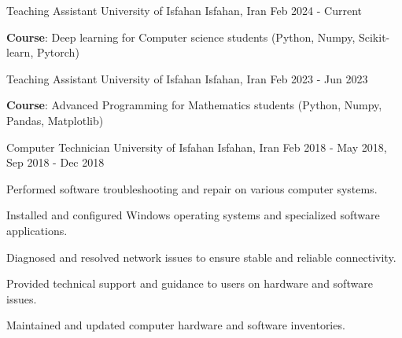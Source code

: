 

\begin{cventries}

  \cventry
    {Teaching Assistant} %
    {University of Isfahan} %
    {Isfahan, Iran} %
    {Feb 2024 - Current } %
    {
      \begin{cvitems} 
      	\textbf{Course}: Deep learning  for Computer science students (Python, Numpy, Scikit-learn,  Pytorch)
      \end{cvitems}
    }
  \cventry
{Teaching Assistant} %
{University of Isfahan} %
{Isfahan, Iran} %
{Feb 2023 - Jun 2023} %
{
	\begin{cvitems} 
		\textbf{Course}: Advanced Programming for Mathematics students (Python, Numpy, Pandas, Matplotlib)
	\end{cvitems}
}
  \cventry
{Computer Technician} %
{University of Isfahan} %
{Isfahan, Iran} %
{Feb 2018 - May 2018,  Sep 2018 - Dec 2018} %
{
      \begin{cvitems} %
	\item {Performed software troubleshooting and repair on various computer systems.}
	\item {Installed and configured Windows operating systems and specialized software applications.}
	\item {Diagnosed and resolved network issues to ensure stable and reliable connectivity.}
	\item {Provided technical support and guidance to users on hardware and software issues.}
	\item {Maintained and updated computer hardware and software inventories.}
\end{cvitems}
}
\end{cventries}
